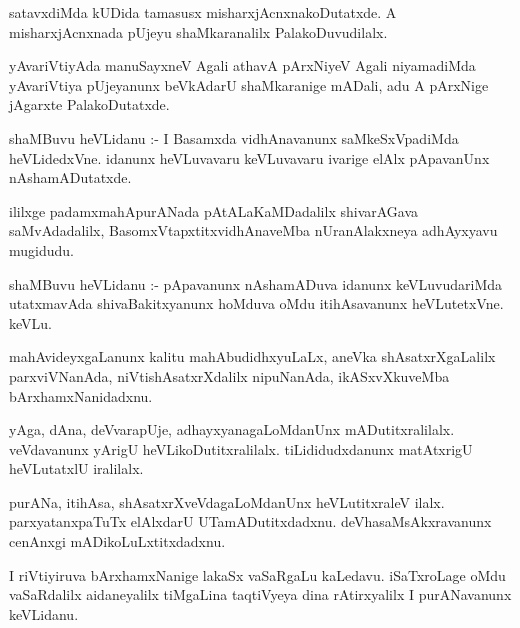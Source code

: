 \documentclass{article}
\begin{document}
\begin{mn}
satavxdiMda  kUDida  tamasusx  misharxjAcnxnakoDutatxde.  A  misharxjAcnxnada  pUjeyu  shaMkaranalilx  PalakoDuvudilalx.
\end{mn}

\begin{mn}
yAvariVtiyAda  manuSayxneV  Agali  athavA  pArxNiyeV  Agali  niyamadiMda  yAvariVtiya  pUjeyanunx  
beVkAdarU  shaMkaranige  mADali,  adu  A  pArxNige  jAgarxte  PalakoDutatxde.
\end{mn}

\begin{mn}
shaMBuvu  heVLidanu :- I  Basamxda  vidhAnavanunx  saMkeSxVpadiMda  heVLidedxVne.  idanunx  
heVLuvavaru  keVLuvavaru  ivarige  elAlx  pApavanUnx  nAshamADutatxde.
\end{mn}

\begin{mn}
ililxge  padamxmahApurANada  pAtALaKaMDadalilx  shivarAGava saMvAdadalilx,  BasomxVtapxtitxvidhAnaveMba  
nUranAlakxneya  adhAyxyavu  mugidudu.
\end{mn}

\begin{mn}
shaMBuvu  heVLidanu :- pApavanunx  nAshamADuva  idanunx  keVLuvudariMda  utatxmavAda  shivaBakitxyanunx  
hoMduva  oMdu  itihAsavanunx  heVLutetxVne.  keVLu.
\end{mn}

\begin{mn}
mahAvideyxgaLanunx  kalitu  mahAbudidhxyuLaLx,  aneVka  shAsatxrXgaLalilx  parxviVNanAda,  
niVtishAsatxrXdalilx  nipuNanAda,  ikASxvXkuveMba  bArxhamxNanidadxnu.
\end{mn}

\begin{mn}
yAga,  dAna,  deVvarapUje,  adhayxyanagaLoMdanUnx  mADutitxralilalx.  veVdavanunx  yArigU  
heVLikoDutitxralilalx.  tiLididudxdanunx  matAtxrigU  heVLutatxlU  iralilalx.
\end{mn}

\begin{mn}
purANa,  itihAsa,  shAsatxrXveVdagaLoMdanUnx  heVLutitxraleV  ilalx.  parxyatanxpaTuTx  elAlxdarU  
UTamADutitxdadxnu.  deVhasaMsAkxravanunx  cenAnxgi  mADikoLuLxtitxdadxnu.
\end{mn}

\begin{mn}
I riVtiyiruva  bArxhamxNanige  lakaSx  vaSaRgaLu  kaLedavu.  iSaTxroLage  oMdu  vaSaRdalilx  
aidaneyalilx  tiMgaLina  taqtiVyeya  dina  rAtirxyalilx  I purANavanunx  keVLidanu.
\end{mn}
\end{document}
